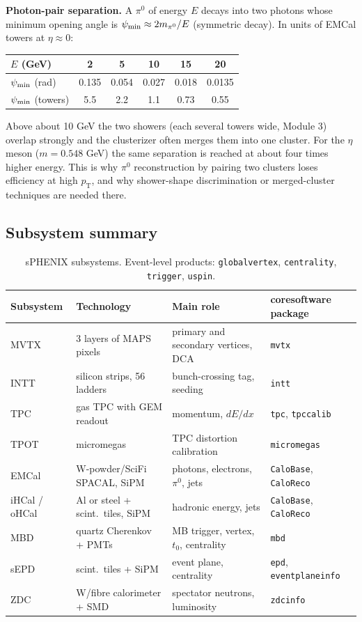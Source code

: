 \documentclass[11pt,letterpaper]{article}
\newcommand{\pT}{p_{\mathrm{T}}}
\begin{document}
\textbf{Photon-pair separation.} A $\pi^0$ of energy $E$ decays into two photons whose minimum opening angle is
$\psi_{\rm min}\approx2m_{\pi^0}/E$ (symmetric decay). In units of EMCal towers at $\eta\approx0$:
\begin{center}\small
\begin{tabular}{@{}lccccc@{}}\toprule
$E$ (GeV) & 2 & 5 & 10 & 15 & 20\\\midrule
$\psi_{\rm min}$ (rad) & 0.135 & 0.054 & 0.027 & 0.018 & 0.0135\\
$\psi_{\rm min}$ (towers) & 5.5 & 2.2 & 1.1 & 0.73 & 0.55\\\bottomrule
\end{tabular}\end{center}
Above about 10 GeV the two showers (each several towers wide, Module 3) overlap strongly and the clusterizer often merges
them into one cluster. For the $\eta$ meson ($m=0.548$ GeV) the same separation is reached at about four times higher energy.
This is why $\pi^0$ reconstruction by pairing two clusters loses efficiency at high $\pT$, and why shower-shape
discrimination or merged-cluster techniques are needed there.

\subsection{Subsystem summary}
\begin{table}[h]\centering\small
\begin{tabularx}{\linewidth}{@{}lXXl@{}}\toprule
Subsystem & Technology & Main role & coresoftware package\\\midrule
MVTX & 3 layers of MAPS pixels & primary and secondary vertices, DCA & \texttt{mvtx}\\
INTT & silicon strips, 56 ladders & bunch-crossing tag, seeding & \texttt{intt}\\
TPC & gas TPC with GEM readout & momentum, $dE/dx$ & \texttt{tpc}, \texttt{tpccalib}\\
TPOT & micromegas & TPC distortion calibration & \texttt{micromegas}\\
EMCal & W-powder/SciFi SPACAL, SiPM & photons, electrons, $\pi^0$, jets & \texttt{CaloBase}, \texttt{CaloReco}\\
iHCal / oHCal & Al or steel + scint.\ tiles, SiPM & hadronic energy, jets & \texttt{CaloBase}, \texttt{CaloReco}\\
MBD & quartz Cherenkov + PMTs & MB trigger, vertex, $t_0$, centrality & \texttt{mbd}\\
sEPD & scint.\ tiles + SiPM & event plane, centrality & \texttt{epd}, \texttt{eventplaneinfo}\\
ZDC & W/fibre calorimeter + SMD & spectator neutrons, luminosity & \texttt{zdcinfo}\\
\bottomrule\end{tabularx}
\caption{sPHENIX subsystems. Event-level products: \texttt{globalvertex}, \texttt{centrality}, \texttt{trigger}, \texttt{uspin}.}
\end{table}
\end{document}
